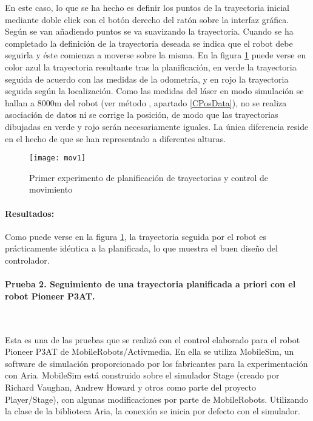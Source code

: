 \noindent
En este caso, lo que se ha hecho es definir los puntos de la trayectoria inicial mediante doble click con el botón derecho del ratón sobre la interfaz gráfica. Según se van añadiendo puntos se va suavizando la trayectoria. Cuando se ha completado la definición de la trayectoria deseada se indica que el robot debe seguirla y éste comienza a moverse sobre la misma. En la figura \ref{fg:mov1} puede verse en color azul la trayectoria resultante tras la planificación, en verde la trayectoria seguida de acuerdo con las medidas de la odometría, y en rojo la trayectoria seguida según la localización. Como las medidas del láser en modo simulación se hallan a 8000m del robot (ver método , apartado \ref{CPosData}), no se realiza asociación de datos ni se corrige la posición, de modo que las trayectorias dibujadas en verde y rojo serán necesariamente iguales. La única diferencia reside en el hecho de que se han representado a diferentes alturas.

\begin{figure}[h]
  \centering\texttt{[image: mov1]}\\
  \caption{Primer experimento de planificación de trayectorias y control de movimiento}\label{fg:mov1}
\end{figure}

\paragraph{Resultados:}
Como puede verse en la figura \ref{fg:mov1}, la trayectoria seguida por el robot es prácticamente idéntica a la planificada, lo que muestra el buen diseño del controlador.

\paragraph{Prueba 2. Seguimiento de una trayectoria planificada a priori con el robot Pioneer P3AT.}\ %

\noindent
Esta es una de las pruebas que se realizó con el control elaborado para el robot Pioneer P3AT de MobileRobots/Activmedia. En ella se utiliza MobileSim, un software de simulación proporcionado por los fabricantes para la experimentación con Aria. MobileSim está construido sobre el simulador Stage (creado por Richard Vaughan, Andrew Howard y otros como parte del proyecto Player/Stage), con algunas modificaciones por parte de MobileRobots. Utilizando la clase  de la biblioteca Aria, la conexión se inicia por defecto con el simulador.

